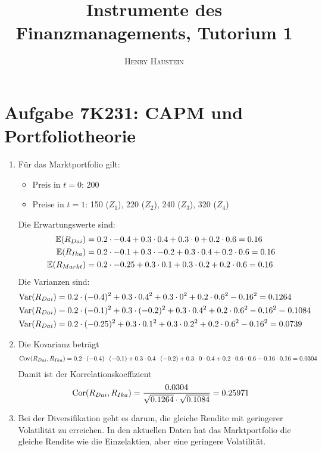 \documentclass{article}
\title{\textbf{Instrumente des Finanzmanagements, Tutorium 1}}
\author{\textsc{Henry Haustein}}
\date{}
\newcommand{\E}{\mathbb{E}}
\DeclareMathOperator{\Var}{Var}
\DeclareMathOperator{\Cov}{Cov}
\DeclareMathOperator{\Cor}{Cor}
\begin{document}
	\maketitle
	
	\section*{Aufgabe 7K231: CAPM und Portfoliotheorie}
	\begin{enumerate}[label=(\alph*)]
		\item Für das Marktportfolio gilt:
		\begin{itemize}
			\item Preis in $t=0$: 200
			\item Preise in $t=1$: 150 ($Z_1$), 220 ($Z_2$), 240 ($Z_3$), 320 ($Z_4$)
		\end{itemize}Die Erwartungswerte sind:
		\begin{align}
			\E(R_{Dai}) &= 0.2\cdot -0.4 + 0.3\cdot 0.4 + 0.3\cdot 0 + 0.2\cdot 0.6 = 0.16 \notag \\
			\E(R_{Ika}) &= 0.2\cdot -0.1 + 0.3\cdot -0.2 + 0.3\cdot 0.4 + 0.2\cdot 0.6 = 0.16 \notag \\
			\E(R_{Markt}) &= 0.2\cdot -0.25 + 0.3\cdot 0.1 + 0.3\cdot 0.2 + 0.2\cdot 0.6 = 0.16 \notag
		\end{align}
		Die Varianzen sind:
		\begin{align}
			\Var(R_{Dai}) &= 0.2\cdot (-0.4)^2 + 0.3\cdot 0.4^2 + 0.3\cdot 0^2 + 0.2\cdot 0.6^2 - 0.16^2 = 0.1264 \notag \\
			\Var(R_{Dai}) &= 0.2\cdot (-0.1)^2 + 0.3\cdot (-0.2)^2 + 0.3\cdot 0.4^2 + 0.2\cdot 0.6^2 - 0.16^2 = 0.1084 \notag \\
			\Var(R_{Dai}) &= 0.2\cdot (-0.25)^2 + 0.3\cdot 0.1^2 + 0.3\cdot 0.2^2 + 0.2\cdot 0.6^2 - 0.16^2 = 0.0739 \notag 
		\end{align}
		\item Die Kovarianz beträgt
		\begin{align}
			\Cov(R_{Dai}, R_{Ika}) = 0.2\cdot (-0.4)\cdot (-0.1) + 0.3\cdot 0.4\cdot (-0.2) + 0.3\cdot 0\cdot 0.4 + 0.2\cdot 0.6\cdot 0.6 - 0.16\cdot 0.16 = 0.0304 \notag
		\end{align}
		Damit ist der Korrelationskoeffizient
		\begin{align}
			\Cor(R_{Dai}, R_{Ika}) = \frac{0.0304}{\sqrt{0.1264}\cdot \sqrt{0.1084}} = 0.25971 \notag
		\end{align}
		\item Bei der Diversifikation geht es darum, die gleiche Rendite mit geringerer Volatilität zu erreichen. In den aktuellen Daten hat das Marktportfolio die gleiche Rendite wie die Einzelaktien, aber eine geringere Volatilität.

\end{enumerate}
\end{document}
